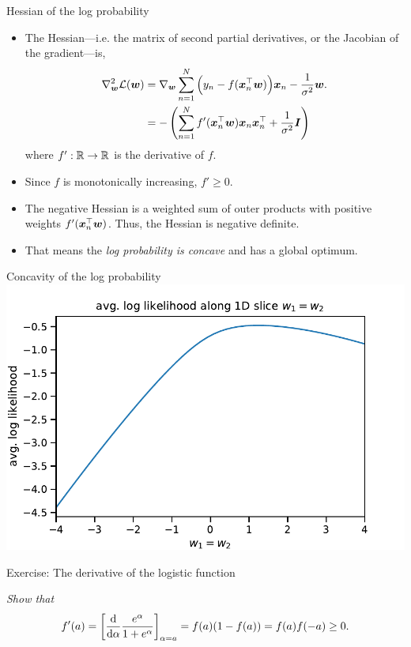 \documentclass[aspectratio=169]{beamer}
\begin{document}
\begin{frame}{Hessian of the log probability}

\begin{itemize}
\item The Hessian---i.e. the matrix of second partial derivatives, or the Jacobian of the gradient---is,
\begin{align}
    \nabla_{\boldsymbol{w}}^2 \mathcal{L}(\boldsymbol{w}) &= 
    \nabla_{\boldsymbol{w}} \sum_{n=1}^N \Big(y_n - f(\boldsymbol{x}_n^\top \boldsymbol{w}) \Big) \boldsymbol{x}_n 
    - \frac{1}{\sigma^2} \boldsymbol{w}.
    \\
    &= -\left( \sum_{n=1}^N f'(\boldsymbol{x}_n^\top \boldsymbol{w}) \boldsymbol{x}_n \boldsymbol{x}_n^\top + \frac{1}{\sigma^2} \boldsymbol{I} \right)
\end{align}
where $f': \mathbb{R} \to \mathbb{R}$ is the derivative of $f$. 

\item Since $f$ is monotonically increasing, $f' \geq 0$.

\item The negative Hessian is a weighted sum of outer products with positive weights $f'(\boldsymbol{x}_n^\top \boldsymbol{w})$. Thus, the Hessian is negative definite.

\item That means the \textit{log probability is concave} and has a global optimum.

\end{itemize}
\end{frame}

\begin{frame}{Concavity of the log probability}
    \centering
    \includegraphics[width=.75\textwidth]{figures/lap2/log_joint_1d.pdf}
\end{frame}


\begin{frame}[t]{Exercise: The derivative of the logistic function}

\textit{Show that}
\begin{align}
    f'(a) = \left[\frac{\mathop{}\!\mathrm{d}}{\mathop{}\!\mathrm{d} \alpha} \frac{e^\alpha}{1+e^\alpha}\right]_{\alpha=a} = f(a) (1 - f(a)) = f(a)f(-a) \geq 0.
\end{align}

\end{frame}
\end{document}
